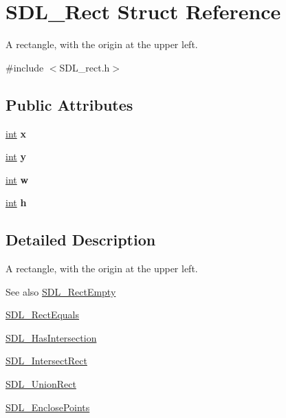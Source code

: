 \hypertarget{struct_s_d_l___rect}{}\section{S\+D\+L\+\_\+\+Rect Struct Reference}
\label{struct_s_d_l___rect}


A rectangle, with the origin at the upper left.  




{\ttfamily \#include $<$S\+D\+L\+\_\+rect.\+h$>$}

\subsection*{Public Attributes}
\begin{DoxyCompactItemize}
\item 
\hypertarget{struct_s_d_l___rect_a85418d94621dd6855805c4b5c7bf6482}{}\hyperlink{_s_d_l__thread_8h_a6a64f9be4433e4de6e2f2f548cf3c08e}{int} {\bfseries x}\label{struct_s_d_l___rect_a85418d94621dd6855805c4b5c7bf6482}

\item 
\hypertarget{struct_s_d_l___rect_a822694af8ddca5fd0d5d94e47106ab85}{}\hyperlink{_s_d_l__thread_8h_a6a64f9be4433e4de6e2f2f548cf3c08e}{int} {\bfseries y}\label{struct_s_d_l___rect_a822694af8ddca5fd0d5d94e47106ab85}

\item 
\hypertarget{struct_s_d_l___rect_a56b7be5738fb6fab86881534a814c45e}{}\hyperlink{_s_d_l__thread_8h_a6a64f9be4433e4de6e2f2f548cf3c08e}{int} {\bfseries w}\label{struct_s_d_l___rect_a56b7be5738fb6fab86881534a814c45e}

\item 
\hypertarget{struct_s_d_l___rect_a0a17d46b320af8063b746153348edd72}{}\hyperlink{_s_d_l__thread_8h_a6a64f9be4433e4de6e2f2f548cf3c08e}{int} {\bfseries h}\label{struct_s_d_l___rect_a0a17d46b320af8063b746153348edd72}

\end{DoxyCompactItemize}


\subsection{Detailed Description}
A rectangle, with the origin at the upper left. 

\begin{DoxySeeAlso}{See also}
\hyperlink{_s_d_l__rect_8h_aac0e9b5d3f34baec6a2cde95bb01f49c}{S\+D\+L\+\_\+\+Rect\+Empty} 

\hyperlink{_s_d_l__rect_8h_a156979fd3561cf90b87741d11057262a}{S\+D\+L\+\_\+\+Rect\+Equals} 

\hyperlink{_s_d_l__rect_8h_a191ec0b069421d4a36304b475697e847}{S\+D\+L\+\_\+\+Has\+Intersection} 

\hyperlink{_s_d_l__rect_8h_aff8e3dd3b1a25443cd7c8cf02a087290}{S\+D\+L\+\_\+\+Intersect\+Rect} 

\hyperlink{_s_d_l__rect_8h_a659f2c25335202888408c95195823f9c}{S\+D\+L\+\_\+\+Union\+Rect} 

\hyperlink{_s_d_l__rect_8h_afcbb58dbba760b9e6fdb4b5d1ece015c}{S\+D\+L\+\_\+\+Enclose\+Points} 
\end{DoxySeeAlso}



